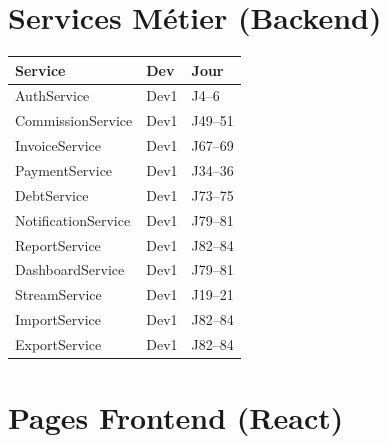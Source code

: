\documentclass[12pt,a4paper]{report}
\begin{document}
\section{Services Métier (Backend)}

\begin{longtable}{L{6cm} L{3cm} L{5cm}}
    \toprule
    \textbf{Service} & \textbf{Dev} & \textbf{Jour} \\
    \midrule
    AuthService & Dev1 & J4--6 \\
    CommissionService & Dev1 & J49--51 \\
    InvoiceService & Dev1 & J67--69 \\
    PaymentService & Dev1 & J34--36 \\
    DebtService & Dev1 & J73--75 \\
    NotificationService & Dev1 & J79--81 \\
    ReportService & Dev1 & J82--84 \\
    DashboardService & Dev1 & J79--81 \\
    StreamService & Dev1 & J19--21 \\
    ImportService & Dev1 & J82--84 \\
    ExportService & Dev1 & J82--84 \\
    \bottomrule
\end{longtable}

\section{Pages Frontend (React)}
\end{document}
